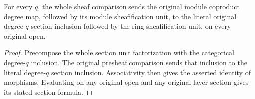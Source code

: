\begin{corollary}
\label{hir:real-domain-actual-normal-associated-module-ring-sheaf-degrees}
\leanok
For every $q$, the whole sheaf comparison sends the original module
coproduct degree map, followed by its module sheafification unit,
to the literal original degree-$q$ section inclusion followed by
the ring sheafification unit, on every original open.
\end{corollary}
\begin{proof}
Precompose the whole section unit factorization with the categorical
degree-$q$ inclusion. The original presheaf comparison sends that
inclusion to the literal degree-$q$ section inclusion. Associativity
then gives the asserted identity of morphisms. Evaluating on any
original open and any original layer section gives its stated
section formula.
\end{proof}
